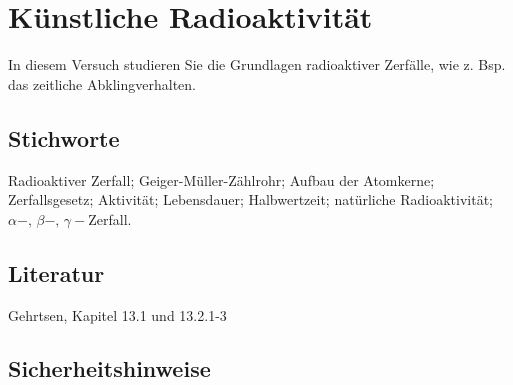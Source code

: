\chapter{Künstliche Radioaktivität}
\label{v:19}

In diesem Versuch studieren Sie die Grundlagen radioaktiver Zerfälle, wie z. Bsp. das zeitliche Abklingverhalten.

\section{Stichworte}

Radioaktiver Zerfall; Geiger-Müller-Zählrohr; Aufbau der Atomkerne; Zerfallsgesetz; Aktivität; Lebensdauer; Halbwertzeit; natürliche Radioaktivität; $\alpha-,\,\beta-,\,\gamma-$Zerfall.
%
\section{Literatur}

Gehrtsen, Kapitel 13.1 und 13.2.1-3
%
\section{Sicherheitshinweise}


